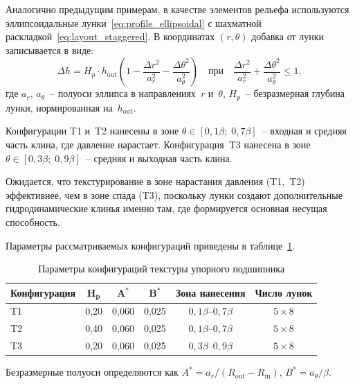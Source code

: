 Аналогично предыдущим примерам, в качестве элементов рельефа используются
эллипсоидальные лунки~\eqref{eq:profile_ellipsoidal}
с шахматной раскладкой~\eqref{eq:layout_staggered}.
В координатах $(r, \theta)$ добавка от лунки записывается
в виде:
\begin{equation}
  \Delta h = H_p \cdot h_{\mathrm{out}}
    \left(1 - \frac{\Delta r^2}{a_r^2}
    - \frac{\Delta\theta^2}{a_\theta^2}\right)
  \quad \text{при}\quad
    \frac{\Delta r^2}{a_r^2}
    + \frac{\Delta\theta^2}{a_\theta^2} \leq 1,
  \label{eq:thrust_dimple}
\end{equation}
где $a_r$, $a_\theta$~-- полуоси эллипса в направлениях~$r$
и~$\theta$, $H_p$~-- безразмерная глубина лунки, нормированная
на~$h_{\mathrm{out}}$.

Конфигурации T1 и~T2 нанесены в зоне
$\theta \in [0{,}1\beta;\; 0{,}7\beta]$~-- входная и средняя
часть клина, где давление нарастает. Конфигурация~T3 нанесена
в зоне $\theta \in [0{,}3\beta;\; 0{,}9\beta]$~-- средняя
и выходная часть клина.

Ожидается, что текстурирование в зоне нарастания давления (T1,~T2)
эффективнее, чем в зоне спада (T3), поскольку лунки создают
дополнительные гидродинамические клинья именно там, где формируется
основная несущая способность.

Параметры рассматриваемых конфигураций приведены в
таблице~\ref{tab:thrust_texture}.

\begin{table}[!ht]
\centering
\caption{Параметры конфигураций текстуры упорного подшипника}
\label{tab:thrust_texture}
\begin{tabularx}{\textwidth}{|X|c|c|c|c|c|}
\hline
\multicolumn{1}{|c|}{\textbf{Конфигурация}}
  & $\boldsymbol{H_p}$
  & $\boldsymbol{A^*}$
  & $\boldsymbol{B^*}$
  & \textbf{Зона нанесения}
  & \textbf{Число лунок} \\
\hline
T1 & 0{,}20 & 0{,}060 & 0{,}025 & $0{,}1\beta$--$0{,}7\beta$ & $5 \times 8$ \\
\hline
T2 & 0{,}40 & 0{,}060 & 0{,}025 & $0{,}1\beta$--$0{,}7\beta$ & $5 \times 8$ \\
\hline
T3 & 0{,}20 & 0{,}060 & 0{,}025 & $0{,}3\beta$--$0{,}9\beta$ & $5 \times 8$ \\
\hline
\end{tabularx}
\end{table}

\FloatBarrier

Безразмерные полуоси определяются как
$A^* = a_r / (R_{\mathrm{out}} - R_{\mathrm{in}})$,
$B^* = a_\theta / \beta$.


